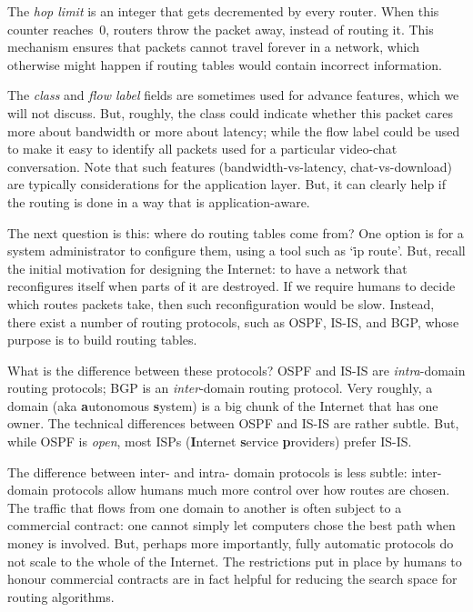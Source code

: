 The \emph{hop limit} is an integer that gets decremented by every router.
When this counter reaches~0,
  routers throw the packet away,
  instead of routing it.
This mechanism ensures that packets cannot travel forever in a network,
  which otherwise might happen if routing tables would contain incorrect information.

The \emph{class} and \emph{flow label} fields are sometimes used for advance features,
  which we will not discuss.
But, roughly,
  the class could indicate whether this packet cares
    more about bandwidth or more about latency;
  while the flow label could be used to make
      it easy to identify all packets used for a particular video-chat conversation.
Note that such features (bandwidth-vs-latency, chat-vs-download)
  are typically considerations for the application layer.
But, it can clearly help if the routing is done in a way
  that is application-aware.

\medskip

The next question is this: where do routing tables come from?
One option is for a system administrator to configure them,
  using a tool such as `\.{ip route}'.
But, recall the initial motivation for designing the Internet:
  to have a network that reconfigures itself when parts of it are destroyed.
If we require humans to decide which routes packets take,
  then such reconfiguration would be slow.
Instead, there exist a number of routing protocols,
  such as OSPF, IS-IS, and BGP,
  whose purpose is to build routing tables.

What is the difference between these protocols?
OSPF and IS-IS are \emph{intra}-domain routing protocols;
  BGP is an \emph{inter}-domain routing protocol.
Very roughly,
  a domain (aka {\bf a}utonomous {\bf s}ystem)
  is a big chunk of the Internet that has one owner.
The technical differences between OSPF and IS-IS are rather subtle.
But, while OSPF is \emph{open},
  most ISPs ({\bf I}nternet {\bf s}ervice {\bf p}roviders) prefer IS-IS\null.

The difference between inter- and intra- domain protocols is less subtle:
  inter-domain protocols allow humans much more control
    over how routes are chosen.
The traffic that flows from one domain to another
  is often subject to a commercial contract:
  one cannot simply let computers chose the best path when money is involved.
But, perhaps more importantly,
  fully automatic protocols do not scale to the whole of the Internet.
The restrictions put in place by humans to honour commercial contracts
  are in fact helpful for reducing the search space for routing algorithms.

